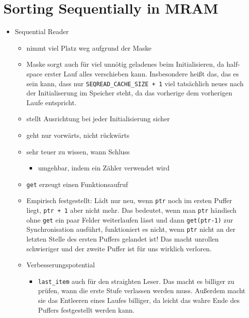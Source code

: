 \chapter{Sorting Sequentially in MRAM}
\label{sec:mram}

\begin{itemize}
	\item
	Sequential Reader
	\begin{itemize}
		\item
		nimmt viel Platz weg aufgrund der Maske

		\item
		Maske sorgt auch für viel unnötig geladenes beim Initialisieren, da half-space \MS{} erster Lauf alles verschieben kann.
		Insbesondere heißt das, das es sein kann, dass nur \lstinline|SEQREAD_CACHE_SIZE + 1| viel tatsächlich neues nach der Initialiserung im Speicher steht, da das vorherige dem vorherigen Laufe entspricht.

		\item
		stellt Ausrichtung bei jeder Initialisierung sicher

		\item
		geht nur vorwärts, nicht rückwärts

		\item
		sehr teuer zu wissen, wann Schluss
		\begin{itemize}
			\item
			umgehbar, indem ein Zähler verwendet wird
		\end{itemize}

		\item
		\lstinline|get| erzeugt einen Funktionsaufruf

		\item
		Empirisch festgestellt:
		Lädt nur neu, wenn \lstinline|ptr| noch im ersten Puffer liegt, \lstinline|ptr + 1| aber nicht mehr.
		Das bedeutet, wenn man \lstinline|ptr| händisch ohne \lstinline|get| ein paar Felder weiterlaufen lässt und dann \lstinline|get(ptr-1)| zur Synchronisation ausführt, funktioniert es nicht, wenn \lstinline|ptr| nicht an der letzten Stelle des ersten Puffers gelandet ist!
		Das macht unrollen schwieriger und der zweite Puffer ist für uns wirklich verloren.

		\item
		Verbesserungspotential
		\begin{itemize}
			\item
			\lstinline|last_item| auch für den straighten Leser.
			Das macht es billiger zu prüfen, wann die erste Stufe verlassen werden muss.
			Außerdem macht sie das Entleeren eines Laufes billiger, da leicht das wahre Ende des Puffers festgestellt werden kann.
		\end{itemize}
	\end{itemize}


\end{itemize}
